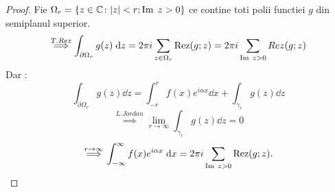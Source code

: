 \begin{tip}
\begin{proof}
        Fie $\Omega_r = \{z \in \mathbb{C} \colon |z|<r ; \operatorname{Im}\; z>0\}$ ce contine toti polii functiei
        $g$ din semiplanul superior.
        \[
            \overset{T.Rez}{\implies} \int_{\partial \Omega_r} g(z) \; \mathrm{d} z
                = 2 \pi i \sum_{z \in \Omega_r} \operatorname{Rez}(g;z)
                = 2 \pi i \sum_{\operatorname{Im}\; z > 0} Rez(g;z)
        \]
        Dar :
        \[
            \int_{\partial \Omega_r} g(z) \dd z
                = \int_{-r}^{r} f(x)e^{i \alpha x} \dd x
                + \int_{\gamma_r} g(z) \dd z
        \]
        \[
            \overset{L.Jordan}{\implies} \lim_{r \to \infty} \int_{\gamma_r} g(z) \dd z = 0
        \]
        \[
            \overset{r\to\infty}{\implies} \int_{-\infty}^{\infty} f(x)e^{i \alpha x} \; \mathrm{d} x
                = 2 \pi i \sum_{\operatorname{Im}\; z > 0} \operatorname{Rez}(g;z).
        \]
    \end{proof}

\end{tip}